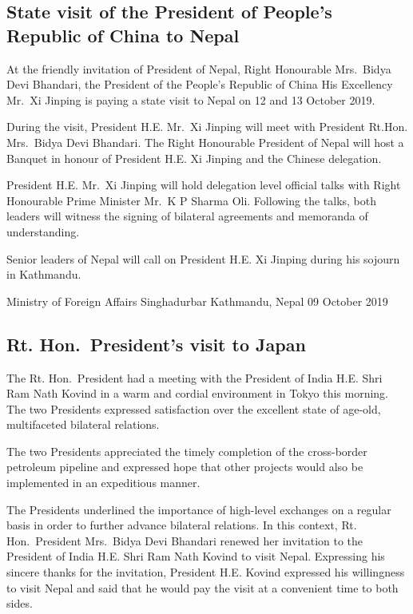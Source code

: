 \documentclass[
  openany]{book}
\begin{document}
\hypertarget{state-visit-of-the-president-of-peoples-republic-of-china-to-nepal}{%
\subsection{State visit of the President of People's Republic of China to Nepal}\label{state-visit-of-the-president-of-peoples-republic-of-china-to-nepal}}

At the friendly invitation of President of Nepal, Right Honourable Mrs.~Bidya Devi Bhandari, the President of the People's Republic of China His Excellency Mr.~Xi Jinping is paying a state visit to Nepal on 12 and 13 October 2019.

During the visit, President H.E. Mr.~Xi Jinping will meet with President Rt.Hon. Mrs.~Bidya Devi Bhandari. The Right Honourable President of Nepal will host a Banquet in honour of President H.E. Xi Jinping and the Chinese delegation.

President H.E. Mr.~Xi Jinping will hold delegation level official talks with Right Honourable Prime Minister Mr.~K P Sharma Oli. Following the talks, both leaders will witness the signing of bilateral agreements and memoranda of understanding.

Senior leaders of Nepal will call on President H.E. Xi Jinping during his sojourn in Kathmandu.

Ministry of Foreign Affairs
Singhadurbar
Kathmandu, Nepal
09 October 2019

\hypertarget{rt.-hon.-presidents-visit-to-japan}{%
\subsection{Rt. Hon.~President's visit to Japan}\label{rt.-hon.-presidents-visit-to-japan}}

The Rt. Hon.~President had a meeting with the President of India H.E. Shri Ram Nath Kovind in a warm and cordial environment in Tokyo this morning. The two Presidents expressed satisfaction over the excellent state of age-old, multifaceted bilateral relations.

The two Presidents appreciated the timely completion of the cross-border petroleum pipeline and expressed hope that other projects would also be implemented in an expeditious manner.

The Presidents underlined the importance of high-level exchanges on a regular basis in order to further advance bilateral relations. In this context, Rt. Hon.~President Mrs.~Bidya Devi Bhandari renewed her invitation to the President of India H.E. Shri Ram Nath Kovind to visit Nepal. Expressing his sincere thanks for the invitation, President H.E. Kovind expressed his willingness to visit Nepal and said that he would pay the visit at a convenient time to both sides.
\end{document}
